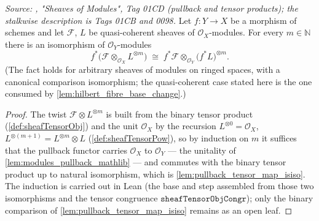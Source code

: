 \begin{lemma}\leanok
  \label{lem:pullback_moduleTensorPow}
  \textit{Source: \cite{stacks-project}, "Sheaves of Modules", Tag 01CD (pullback
  and tensor products); the stalkwise description is Tags 01CB and 0098.}
  Let \(f : Y \to X\) be a morphism of schemes and let \(\mathcal{F}\), \(L\)
  be quasi-coherent sheaves of \(\mathcal{O}_X\)-modules.  For every
  \(m \in \mathbb{N}\) there is an isomorphism of \(\mathcal{O}_Y\)-modules
  \[
    f^*\bigl(\mathcal{F} \otimes_{\mathcal{O}_X} L^{\otimes m}\bigr)
    \;\cong\;
    f^*\mathcal{F} \otimes_{\mathcal{O}_Y} \bigl(f^*L\bigr)^{\otimes m}.
  \]
  (The fact holds for arbitrary sheaves of modules on ringed spaces, with a
  canonical comparison isomorphism; the quasi-coherent case stated here is
  the one consumed by \cref{lem:hilbert_fibre_base_change}.)
\end{lemma}
\begin{proof}
  The twist \(\mathcal{F} \otimes L^{\otimes m}\) is built from the binary
  tensor product (\cref{def:sheafTensorObj}) and the unit
  \(\mathcal{O}_X\) by the recursion \(L^{\otimes 0} = \mathcal{O}_X\),
  \(L^{\otimes (m+1)} = L^{\otimes m} \otimes L\)
  (\cref{def:sheafTensorPow}), so by induction on \(m\) it suffices that the
  pullback functor carries \(\mathcal{O}_X\) to \(\mathcal{O}_Y\) — the
  unitality of \cref{lem:modules_pullback_mathlib} — and commutes with the
  binary tensor product up to natural isomorphism, which is
  \cref{lem:pullback_tensor_map_isiso}.  The induction is carried out in Lean
  (the base and step assembled from those two isomorphisms and the tensor
  congruence \(\texttt{sheafTensorObjCongr}\)); only the binary comparison of
  \cref{lem:pullback_tensor_map_isiso} remains as an open leaf.
\end{proof}

